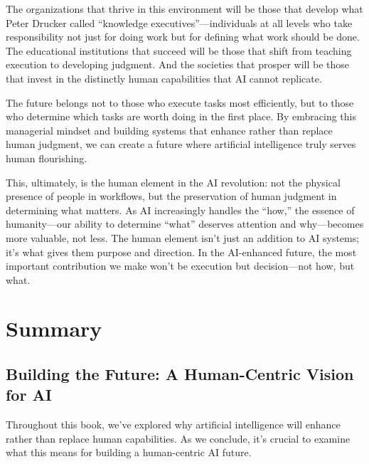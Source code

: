 \documentclass[
  Letterpaper,
]{scrbook}
\begin{document}
The organizations that thrive in this environment will be those that
develop what Peter Drucker called ``knowledge executives''---individuals
at all levels who take responsibility not just for doing work but for
defining what work should be done. The educational institutions that
succeed will be those that shift from teaching execution to developing
judgment. And the societies that prosper will be those that invest in
the distinctly human capabilities that AI cannot replicate.

The future belongs not to those who execute tasks most efficiently, but
to those who determine which tasks are worth doing in the first place.
By embracing this managerial mindset and building systems that enhance
rather than replace human judgment, we can create a future where
artificial intelligence truly serves human flourishing.

This, ultimately, is the human element in the AI revolution: not the
physical presence of people in workflows, but the preservation of human
judgment in determining what matters. As AI increasingly handles the
``how,'' the essence of humanity---our ability to determine ``what''
deserves attention and why---becomes more valuable, not less. The human
element isn't just an addition to AI systems; it's what gives them
purpose and direction. In the AI-enhanced future, the most important
contribution we make won't be execution but decision---not how, but
what.


\chapter*{Summary}\label{summary}


\section*{Building the Future: A Human-Centric Vision for
AI}\label{building-the-future-a-human-centric-vision-for-ai-1}


Throughout this book, we've explored why artificial intelligence will
enhance rather than replace human capabilities. As we conclude, it's
crucial to examine what this means for building a human-centric AI
future.
\end{document}
